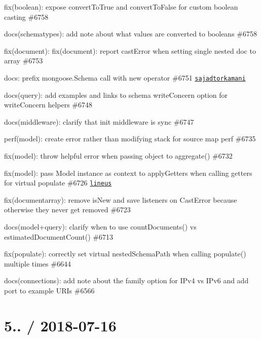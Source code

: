 \begin{DoxyItemize}
\item fix(boolean)\+: expose {\ttfamily convert\+To\+True} and {\ttfamily convert\+To\+False} for custom boolean casting \#6758
\item docs(schematypes)\+: add note about what values are converted to booleans \#6758
\item fix(document)\+: fix(document)\+: report cast\+Error when setting single nested doc to array \#6753
\item docs\+: prefix mongoose.\+Schema call with new operator \#6751 \href{https://github.com/sajadtorkamani}{\tt sajadtorkamani}
\item docs(query)\+: add examples and links to schema write\+Concern option for write\+Concern helpers \#6748
\item docs(middleware)\+: clarify that init middleware is sync \#6747
\item perf(model)\+: create error rather than modifying stack for source map perf \#6735
\item fix(model)\+: throw helpful error when passing object to aggregate() \#6732
\item fix(model)\+: pass Model instance as context to apply\+Getters when calling getters for virtual populate \#6726 \href{https://github.com/lineus}{\tt lineus}
\item fix(documentarray)\+: remove {\ttfamily is\+New} and {\ttfamily save} listeners on Cast\+Error because otherwise they never get removed \#6723
\item docs(model+query)\+: clarify when to use {\ttfamily count\+Documents()} vs {\ttfamily estimated\+Document\+Count()} \#6713
\item fix(populate)\+: correctly set virtual nested\+Schema\+Path when calling populate() multiple times \#6644
\item docs(connections)\+: add note about the {\ttfamily family} option for I\+Pv4 vs I\+Pv6 and add port to example U\+R\+Is \#6566
\end{DoxyItemize}

\section*{5.. / 2018-\/07-\/16 }


